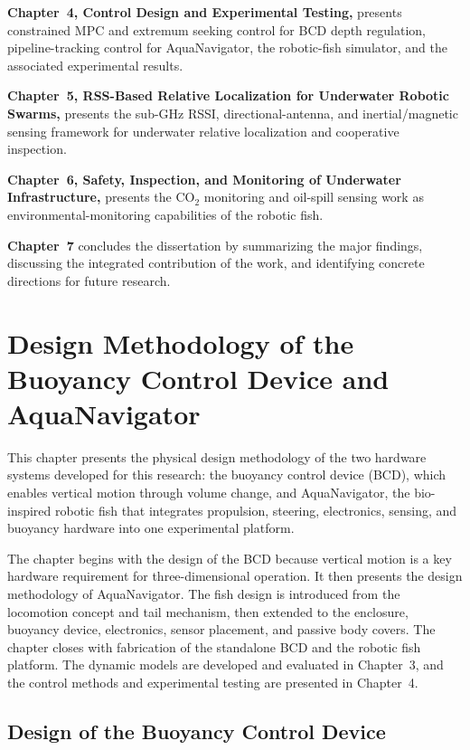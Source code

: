\documentclass{uhcoethesis}
\begin{document}
\textbf{Chapter~4, Control Design and Experimental Testing,} presents constrained MPC and extremum seeking control for BCD depth regulation, pipeline-tracking control for AquaNavigator, the robotic-fish simulator, and the associated experimental results.

\textbf{Chapter~5, RSS-Based Relative Localization for Underwater Robotic Swarms,} presents the sub-GHz RSSI, directional-antenna, and inertial/magnetic sensing framework for underwater relative localization and cooperative inspection.

\textbf{Chapter~6, Safety, Inspection, and Monitoring of Underwater Infrastructure,} presents the \mbox{CO$_2$} monitoring and oil-spill sensing work as environmental-monitoring capabilities of the robotic fish.

\textbf{Chapter~7} concludes the dissertation by summarizing the major findings, discussing the integrated contribution of the work, and identifying concrete directions for future research.

\chapter{Design Methodology of the Buoyancy Control Device and AquaNavigator}

This chapter presents the physical design methodology of the two hardware systems developed for this research: the buoyancy control device (BCD), which enables vertical motion through volume change, and AquaNavigator, the bio-inspired robotic fish that integrates propulsion, steering, electronics, sensing, and buoyancy hardware into one experimental platform.

The chapter begins with the design of the BCD because vertical motion is a key hardware requirement for three-dimensional operation. It then presents the design methodology of AquaNavigator. The fish design is introduced from the locomotion concept and tail mechanism, then extended to the enclosure, buoyancy device, electronics, sensor placement, and passive body covers. The chapter closes with fabrication of the standalone BCD and the robotic fish platform. The dynamic models are developed and evaluated in Chapter~3, and the control methods and experimental testing are presented in Chapter~4.

\section{Design of the Buoyancy Control Device}
\end{document}
